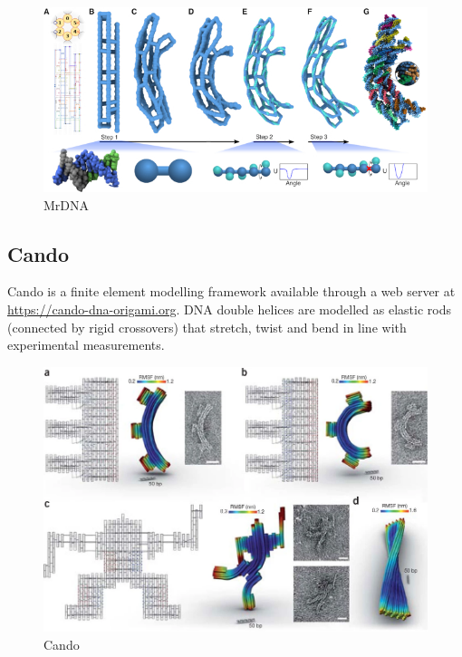 \begin{figure}[h]
  \begin{center}
    \includegraphics[width=\textwidth]{figures/mrDNA.jpg}
    \caption{MrDNA}
    \label{fig:mrdna}
  \end{center}
\end{figure}

\subsection{Cando}

Cando is a finite element modelling framework\cite{kim2012cando} available through a web server at \url{https://cando-dna-origami.org}. DNA double helices are modelled as elastic rods (connected by rigid crossovers) that stretch, twist and bend in line with experimental measurements.

\begin{figure}[h]
  \begin{center}
    \includegraphics[width=\textwidth]{figures/cando.png}
    \caption{Cando}
    \label{fig:cando}
  \end{center}
\end{figure}